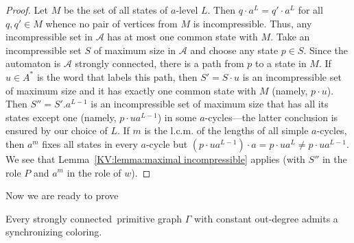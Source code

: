 \documentclass{irmaart}
\newcommand{\scn}{strongly connected}
\theoremstyle{plain}
\begin{document}
\begin{proof}
Let $M$ be the set of all states of $a$-level $L$. Then $q\cdot a^L=q'\cdot
a^L$ for all $q,q'\in M$ whence no pair of vertices from $M$ is incompressible.
Thus, any incompressible set in $\mathcal{A}$ has at most one common state with
$M$. Take  an incompressible set $S$ of maximum size in $\mathcal{A}$ and
choose any state $p\in S$. Since the automaton is $\mathcal{A}$ \scn, there is
a path from $p$ to a state in $M$. If $u\in A^*$ is the word that labels this
path, then $S'=S\cdot u$ is an incompressible set of maximum size and it has
exactly one common state with $M$ (namely, $p\cdot u$). Then $S''=S'.a^{L-1}$
is an incompressible set of maximum size that has all its states except one
(namely, $p\cdot ua^{L-1}$) in some $a$-cycles---the latter conclusion is
ensured by our choice of $L$. If $m$ is the l.c.m. of the lengths of all simple
$a$-cycles, then $a^m$ fixes all states in every $a$-cycle but $(p\cdot
ua^{L-1})\cdot a=p\cdot ua^{L}\ne p\cdot ua^{L-1}$. We see that
Lemma~\ref{KV:lemma:maximal incompressible} applies (with $S''$ in the role $P$
and $a^m$ in the role of $w$).
\end{proof}

Now we are ready to prove
\begin{theorem}
\label{KV:thm:road coloring} Every \scn\ primitive graph $\Gamma$ with constant
out-degree admits a synchronizing coloring.
\end{theorem}
\end{document}
